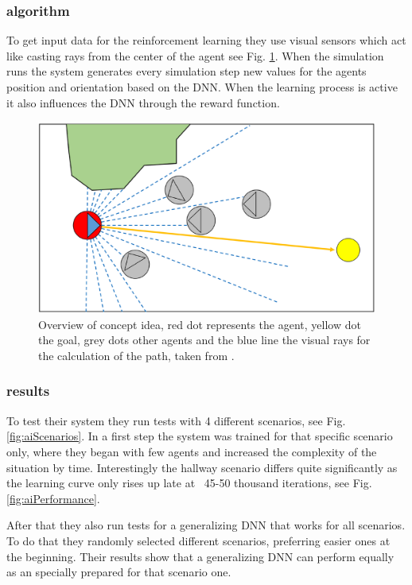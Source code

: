 \documentclass{acmsiggraph}               %
\begin{document}
\subsubsection{algorithm}
To get input data for the reinforcement learning they use visual sensors which act like casting rays from the center of the agent see Fig. \ref{fig:aiConceptOverview}. When the simulation runs the system generates every simulation step new values for the agents position and orientation based on the DNN. When the learning process is active it also influences the DNN through the reward function.
\begin{figure}[h]
  \centering
  \includegraphics[width=1\linewidth]{images/aiAlgortihmn.png}
  \caption{Overview of concept idea, red dot represents the agent, yellow dot the goal, grey dots other agents and the blue line the visual rays for the calculation of the path, taken from \protect\cite{lee_crowd_2018}.}
  \label{fig:aiConceptOverview}
\end{figure}

\subsubsection{results}
To test their system they run tests with 4 different scenarios, see Fig. \ref{fig:aiScenarios}. In a first step the system was trained for that specific scenario only, where they began with few agents and increased the complexity of the situation by time. Interestingly the hallway scenario differs quite significantly as the learning curve only rises up late at ~45-50 thousand iterations, see Fig. \ref{fig:aiPerformance}.

After that they also run tests for a generalizing DNN that works for all scenarios. To do that they randomly selected different scenarios, preferring easier ones at the beginning. Their results show that a generalizing DNN can perform equally as an specially prepared for that scenario one. 
\end{document}
